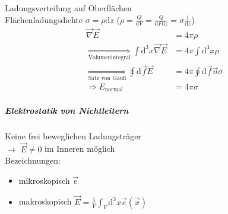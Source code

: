 \documentclass[a4paper]{article}
\begin{document}
Ladungsverteilung auf Oberflächen\\
Flächenladungsdichte $\sigma=\rho \mathrm{d}z$ ($\rho=\frac{Q}{\mathrm{d}V}=\frac{Q}{\mathrm{d}F
\mathrm{d}z}=\sigma \frac{1}{\mathrm{d}z}$)
\begin{align}
\vec{\nabla}\vec{E}&=4\pi\rho\\
\underset{\text{Volumenintegral}}{\Rightarrow}\int \mathrm{d}^3x \vec{\nabla}\vec{E}&=
4\pi \int \mathrm{d}^3x \rho\\
\underset{\text{Satz von Gauß}}{\Rightarrow}\oint \mathrm{d}\vec{f}\vec{E}&=4\pi\oint
\mathrm{d}\vec{f}\vec{n}\sigma\\
\Rightarrow E_{\text{normal}}&=4\pi\sigma 
\end{align}

\subparagraph{Elektrostatik von Nichtleitern}
Keine frei beweglichen Ladungsträger\\
$\rightarrow$ $\vec{E}\neq0$ im Inneren möglich\\
Bezeichnungen:
\begin{itemize}
  \item mikroskopisch $\vec{e}$
  \item makroskopisch $\vec{E}=\frac{1}{V}\int_V \mathrm{d}^3x \vec{e}(\vec{x})$
\end{itemize}
\end{document}
